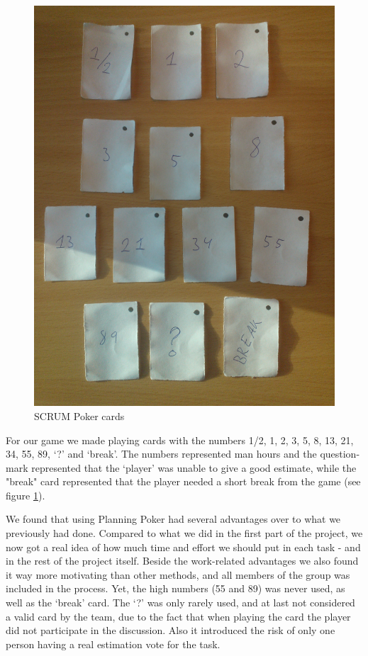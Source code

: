 \begin{figure}[t]
  \centering
  \includegraphics[width=\textwidth, angle=270]{illustrations/scrumPokerCards.jpg}
  \caption{SCRUM Poker cards}
  \label{fig:scrumPokerCards}
\end{figure}

For our game we made playing cards with the numbers 1/2, 1, 2, 3, 5, 8, 13, 21, 34, 55, 89, `?' and `break'. The numbers represented man hours and the question-mark represented that the `player' was unable to give a good estimate, while the "break" card represented that the player needed a short break from the game (see figure \ref{fig:scrumPokerCards}).

We found that using Planning Poker had several advantages over to what we previously had done. Compared to what we did in the first part of the project, we now got a real idea of how much time and effort we should put in each task - and in the rest of the project itself. Beside the work-related advantages we also found it way more motivating than other methods, and all members of the group was included in the process. Yet, the high numbers (55 and 89) was never used, as well as the `break' card. The `?' was only rarely used, and at last not considered a valid card by the team, due to the fact that when playing the card the player did not participate in the discussion. Also it introduced the risk of only one person having a real estimation vote for the task.

